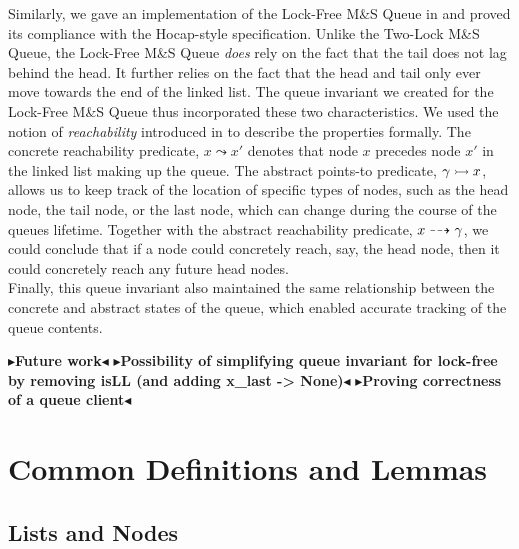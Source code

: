 \documentclass[a4paper, 10pt]{report}
\theoremstyle{definition}
\newcommand{\msq}{M\&S Queue}
\newcommand{\tlmsq}{Two-Lock \msq{}}
\newcommand{\lfmsq}{Lock-Free \msq{}}
\newcommand{\node}{x}
\newcommand{\reach}[2]{#1 \leadsto #2}
\newcommand{\ar}[2]{#1 \dashrightarrow #2}
\newcommand{\ap}[2]{#1 \rightarrowtail #2}
\newcommand{\todo}[1]{{\color[rgb]{.5,0,0}\textbf{$\blacktriangleright$#1$\blacktriangleleft$}}}
\begin{document}
Similarly, we gave an implementation of the \lfmsq{} in \heaplang{} and proved its compliance with the Hocap-style specification. Unlike the \tlmsq{}, the \lfmsq{} \emph{does} rely on the fact that the tail does not lag behind the head. It further relies on the fact that the head and tail only ever move towards the end of the linked list. The queue invariant we created for the \lfmsq{} thus incorporated these two characteristics. We used the notion of \textit{reachability} introduced in \citet{DBLP:conf/cpp/VindumB21} to describe the properties formally. The concrete reachability predicate, $\reach{\node}{\node'}$ denotes that node $\node$ precedes node $\node'$ in the linked list making up the queue. The abstract points-to predicate, $\ap{\gname}{\node}$, allows us to keep track of the location of specific types of nodes, such as the head node, the tail node, or the last node, which can change during the course of the queues lifetime. Together with the abstract reachability predicate, $\ar{\node}{\gname}$, we could conclude that if a node could concretely reach, say, the head node, then it could concretely reach any future head nodes.\\
Finally, this queue invariant also maintained the same relationship between the concrete and abstract states of the queue, which enabled accurate tracking of the queue contents. 

\todo{Future work}
\todo{Possibility of simplifying queue invariant for lock-free by removing isLL (and adding x\_last -> None)}
\todo{Proving correctness of a queue client}


\cleardoublepage
{}




\cleardoublepage
\appendix
\chapter{Common Definitions and Lemmas}\label{ch:appendix:common}

\section{Lists and Nodes}
\label{appendix:common:section:ListsNodes}
\end{document}
